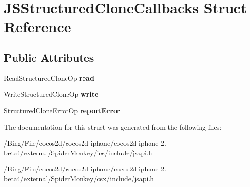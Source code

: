 \hypertarget{struct_j_s_structured_clone_callbacks}{\section{J\-S\-Structured\-Clone\-Callbacks Struct Reference}
\label{struct_j_s_structured_clone_callbacks}
}
\subsection*{Public Attributes}
\begin{DoxyCompactItemize}
\item 
\hypertarget{struct_j_s_structured_clone_callbacks_a41e34ad702a1b3ed1206d81af81effb3}{Read\-Structured\-Clone\-Op {\bfseries read}}\label{struct_j_s_structured_clone_callbacks_a41e34ad702a1b3ed1206d81af81effb3}

\item 
\hypertarget{struct_j_s_structured_clone_callbacks_a5cadf4eec668400cb9cd888e460b1c2c}{Write\-Structured\-Clone\-Op {\bfseries write}}\label{struct_j_s_structured_clone_callbacks_a5cadf4eec668400cb9cd888e460b1c2c}

\item 
\hypertarget{struct_j_s_structured_clone_callbacks_ac32f5812f4840ccdc97ce7bc7cd0db5b}{Structured\-Clone\-Error\-Op {\bfseries report\-Error}}\label{struct_j_s_structured_clone_callbacks_ac32f5812f4840ccdc97ce7bc7cd0db5b}

\end{DoxyCompactItemize}


The documentation for this struct was generated from the following files\-:\begin{DoxyCompactItemize}
\item 
/\-Bing/\-File/cocos2d/cocos2d-\/iphone/cocos2d-\/iphone-\/2.-\/beta4/external/\-Spider\-Monkey/ios/include/jsapi.\-h\item 
/\-Bing/\-File/cocos2d/cocos2d-\/iphone/cocos2d-\/iphone-\/2.-\/beta4/external/\-Spider\-Monkey/osx/include/jsapi.\-h\end{DoxyCompactItemize}
